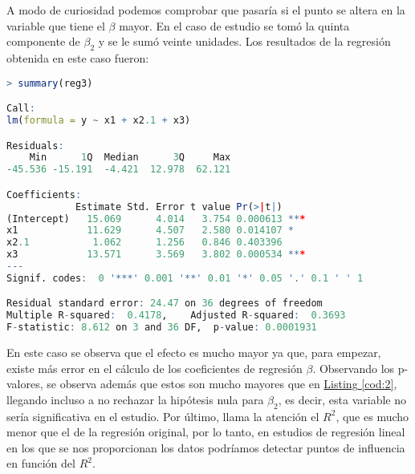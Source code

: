 \documentclass[12pt,a4paper]{article}
\begin{document}
A modo de curiosidad podemos comprobar que pasaría si el punto se altera en la variable que tiene el $\beta$ mayor. En el caso de estudio se tomó la quinta componente de $\beta_2$ y se le sumó veinte unidades. Los resultados de la regresión obtenida en este caso fueron:
\begin{lstlisting}[language=R, caption = Regresión lineal con un punto de influencia, label =cod:4]
> summary(reg3)

Call:
lm(formula = y ~ x1 + x2.1 + x3)

Residuals:
    Min      1Q  Median      3Q     Max 
-45.536 -15.191  -4.421  12.978  62.121 

Coefficients:
            Estimate Std. Error t value Pr(>|t|)    
(Intercept)   15.069      4.014   3.754 0.000613 ***
x1            11.629      4.507   2.580 0.014107 *  
x2.1           1.062      1.256   0.846 0.403396    
x3            13.571      3.569   3.802 0.000534 ***
---
Signif. codes:  0 '***' 0.001 '**' 0.01 '*' 0.05 '.' 0.1 ' ' 1

Residual standard error: 24.47 on 36 degrees of freedom
Multiple R-squared:  0.4178,	Adjusted R-squared:  0.3693 
F-statistic: 8.612 on 3 and 36 DF,  p-value: 0.0001931
\end{lstlisting}
En este caso se observa que el efecto es mucho mayor ya que, para empezar, existe más error en el cálculo de los coeficientes de regresión $\beta$. Observando los p-valores, se observa además que estos son mucho mayores que en \hyperref[cod:2]{Listing \ref{cod:2}}, llegando incluso a no rechazar la hipótesis nula para $\beta_2$, es decir, esta variable no sería significativa en el estudio. Por último, llama la atención el $R^2$, que es mucho menor que el de la regresión original, por lo tanto, en estudios de regresión lineal en los que se nos proporcionan los datos podríamos detectar puntos de influencia en función del $R^2$.
\end{document}
